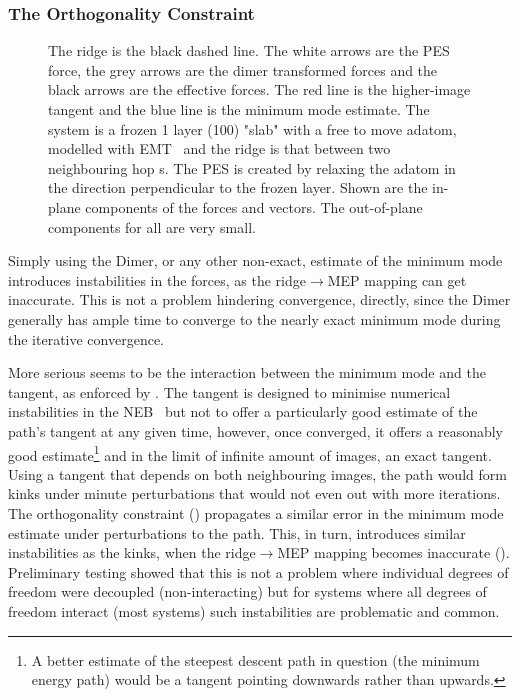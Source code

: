 \subsubsection{The Orthogonality Constraint}
\begin{figure}[htb!]
\begin{center}
    \parbox{0.85\linewidth}{
\caption{
The ridge is the black dashed line.
The white arrows are the PES force, the grey arrows are the dimer transformed forces and the black arrows are the effective forces.
The red line is the higher-image tangent and the blue line is the minimum mode estimate.
The system is a frozen 1 layer (100) "slab" with a free to move  adatom, modelled with EMT~\cite{emt-1996} and the ridge is that between two neighbouring hop s.
The PES is created by relaxing the adatom in the direction perpendicular to the frozen layer.
Shown are the in-plane components of the forces and vectors.
The out-of-plane components for all are very small.
}
\label{fig:orthogonal}
}
\end{center}
\end{figure}

Simply using the Dimer, or any other non-exact, estimate of the minimum mode introduces instabilities in the forces, as the ridge$\rightarrow$MEP mapping can get inaccurate.
This is not a problem hindering convergence, directly, since the Dimer generally has ample time to converge to the nearly exact minimum mode during the iterative convergence.

More serious seems to be the interaction between the minimum mode and the tangent, as enforced by .
The tangent is designed to minimise numerical instabilities in the NEB~\cite{neb-tangent-2000} but not to offer a particularly good estimate of the path's tangent at any given time, however, once converged, it offers a reasonably good estimate\footnote{A better estimate of the steepest descent path in question (the minimum energy path) would be a tangent pointing downwards rather than upwards.} and in the limit of infinite amount of images, an exact tangent.
Using a tangent that depends on both neighbouring images, the path would form kinks under minute perturbations that would not even out with more iterations.
The orthogonality constraint () propagates a similar error in the minimum mode estimate under perturbations to the path.
This, in turn, introduces similar instabilities as the kinks, when the ridge$\rightarrow$MEP mapping becomes inaccurate ().
Preliminary testing showed that this is not a problem where individual degrees of freedom were decoupled (non-interacting) but for systems where all degrees of freedom interact (most systems) such instabilities are problematic and common.

